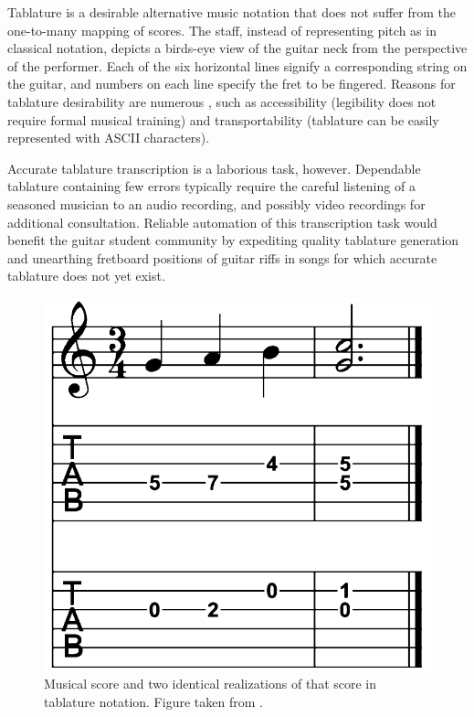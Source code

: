 \documentclass[convention,peer-reviewed]{aesconf}
\begin{document}
Tablature is a desirable alternative music notation that does not suffer from the one-to-many mapping of scores. The staff, instead of representing pitch as in classical notation, depicts a birds-eye view of the guitar neck from the perspective of the performer. Each of the six horizontal lines signify a corresponding string on the guitar, and numbers on each line specify the fret to be fingered. Reasons for tablature desirability are numerous \citep{macrae2010}, such as accessibility (legibility does not require formal musical training) and transportability (tablature can be easily represented with ASCII characters). 

Accurate tablature transcription is a laborious task, however. Dependable tablature containing few errors typically require the careful listening of a seasoned musician to an audio recording, and possibly video recordings for additional consultation. Reliable automation of this transcription task would benefit the guitar student community by expediting quality tablature generation and unearthing fretboard positions of guitar riffs in songs for which accurate tablature does not yet exist.
\begin{figure}[!htbp] 
\centering
\includegraphics[scale=0.2]{figs/score-tabs}
\caption{Musical score and two identical realizations of that score in tablature notation. Figure taken from \citep{barbanchoi2012}.}
\label{fig:score-tabs}
\end{figure}
\end{document}
